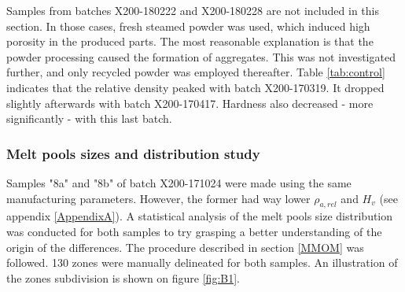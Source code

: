  \begin{center}
\begin{savenotes}
 \begin{table}[ht]
\noindent{}

\caption[Average hardness and relative density measurements for the control cubes of each batch]{Average hardness and relative density measurements for the control cubes of each batch}
\label{tab:control}
\end{table}
\end{savenotes}
 \end{center}

Samples from batches X200-180222 and X200-180228 are not included in this section. In those cases, fresh steamed powder was used, which induced high porosity in the produced parts. The most reasonable explanation is that the powder processing caused the formation of aggregates. This was not investigated further, and only recycled powder was employed thereafter. Table \ref{tab:control} indicates that the relative density peaked with batch X200-170319. It dropped slightly afterwards with batch X200-170417. Hardness also decreased - more significantly - with this last batch.\\

\subsubsection{Melt pools sizes and distribution study}
\label{rs_mps}

Samples "8a" and "8b" of batch X200-171024 were made using the same manufacturing parameters. However, the former had way lower $\rho_{a,rel}$ and $H_v$ (see appendix \ref{AppendixA}). A statistical analysis of the melt pools size distribution was conducted for both samples to try grasping a better understanding of the origin of the differences. The procedure described in section \ref{MMOM} was followed. 130 zones were manually delineated for both samples. An illustration of the zones subdivision is shown on figure \ref{fig:B1}.\\

